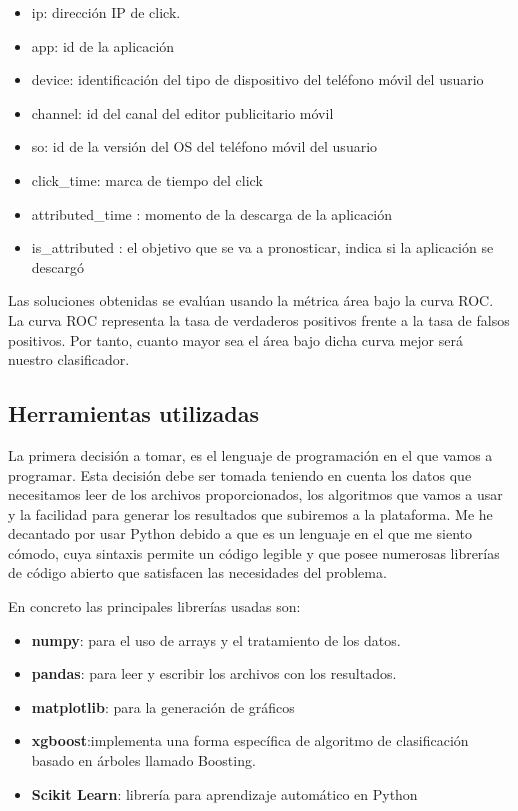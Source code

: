 \begin{itemize}
	
	\item ip: dirección IP de click.
	\item app: id de la aplicación
	\item device: identificación del tipo de dispositivo del teléfono móvil del usuario
	\item channel: id del canal del editor publicitario móvil
	\item so: id de la versión del OS del teléfono móvil del usuario
	\item click\_time: marca de tiempo del click 
	\item attributed\_time : momento de la descarga de la aplicación 
	\item is\_attributed : el objetivo que se va a pronosticar, indica si la aplicación se descargó
\end{itemize}

Las soluciones obtenidas se evalúan usando la métrica área bajo la curva ROC.
\medskip
La curva ROC representa la tasa de verdaderos positivos frente a la tasa de falsos positivos. Por tanto, cuanto mayor sea el área bajo dicha curva mejor será nuestro clasificador.

\subsection{Herramientas utilizadas}
La primera decisión a tomar, es el lenguaje de programación en el que vamos a programar. Esta decisión debe ser tomada teniendo en cuenta los datos que necesitamos leer de los archivos proporcionados, los algoritmos que vamos a usar y la facilidad para generar los resultados que subiremos a la plataforma. Me he decantado por usar Python debido a que es un lenguaje en el que me siento cómodo, cuya sintaxis permite un código legible y que posee numerosas librerías de código abierto que satisfacen las necesidades del problema.
\medskip

En concreto las principales librerías usadas son:
\begin{itemize}
	\item \textbf{numpy}: para el uso de arrays y el tratamiento de los datos.
	\item \textbf{pandas}: para leer y escribir los archivos con los resultados.
	\item \textbf{matplotlib}: para la generación de gráficos
	\item \textbf{xgboost}:implementa una forma específica de
	algoritmo de clasificación basado en árboles llamado Boosting.
	\item \textbf{Scikit Learn}: librería para aprendizaje automático en Python
\end{itemize}
